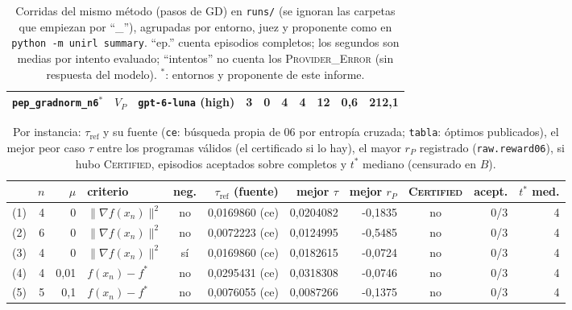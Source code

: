 \documentclass[11pt,a4paper]{article}
\begin{document}
\begin{table}[!ht]
\begin{tabular}{@{}llllrrrrrr@{}}
\texttt{pep\_\allowbreak{}gradnorm\_\allowbreak{}n6}$^\ast$ & $V_P$ & \texttt{gpt-\allowbreak{}6-\allowbreak{}luna} (high) & 3 & 0 & 4 & 4 & 12 & 0{,}6 & 212{,}1 \\
\bottomrule
\end{tabular}
\caption{Corridas del mismo método (pasos de GD) en \texttt{runs/} (se ignoran las carpetas que empiezan por ``\_''), agrupadas por entorno, juez y proponente como en \texttt{python -m unirl summary}. ``ep.'' cuenta episodios completos; los segundos son medias por intento evaluado; ``intentos'' no cuenta los \textsc{Provider\_Error} (sin respuesta del modelo). $^\ast$: entornos y proponente de este informe.}
\label{tab:comparacion}
\end{table}

\begin{table}[!ht]
\centering
\scriptsize
\setlength{\tabcolsep}{4pt}
\begin{tabular}{@{}lrrlcrrrcrr@{}}
\toprule
& $n$ & $\mu$ & criterio & neg. & $\tau_{\mathrm{ref}}$ (fuente) & mejor $\tau$ & mejor $r_P$ & \textsc{Certified} & acept. & $t^*$ med. \\
\midrule
(1) & 4 & 0 & $\|\nabla f(x_n)\|^2$ & no & 0{,}0169860 (ce) & 0{,}0204082 & -0{,}1835 & no & 0/3 & 4 \\
(2) & 6 & 0 & $\|\nabla f(x_n)\|^2$ & no & 0{,}0072223 (ce) & 0{,}0124995 & -0{,}5485 & no & 0/3 & 4 \\
(3) & 4 & 0 & $\|\nabla f(x_n)\|^2$ & sí & 0{,}0169860 (ce) & 0{,}0182615 & -0{,}0724 & no & 0/3 & 4 \\
(4) & 4 & 0{,}01 & $f(x_n) - f^*$ & no & 0{,}0295431 (ce) & 0{,}0318308 & -0{,}0746 & no & 0/3 & 4 \\
(5) & 5 & 0{,}1 & $f(x_n) - f^*$ & no & 0{,}0076055 (ce) & 0{,}0087266 & -0{,}1375 & no & 0/3 & 4 \\
\bottomrule
\end{tabular}
\caption{Por instancia: $\tau_{\mathrm{ref}}$ y su fuente (\texttt{ce}: búsqueda propia de 06 por entropía cruzada; \texttt{tabla}: óptimos publicados), el mejor peor caso $\tau$ entre los programas válidos (el certificado si lo hay), el mayor $r_P$ registrado (\texttt{raw.reward06}), si hubo \textsc{Certified}, episodios aceptados sobre completos y $t^*$ mediano (censurado en $B$).}
\label{tab:instancias}
\end{table}
\end{document}
